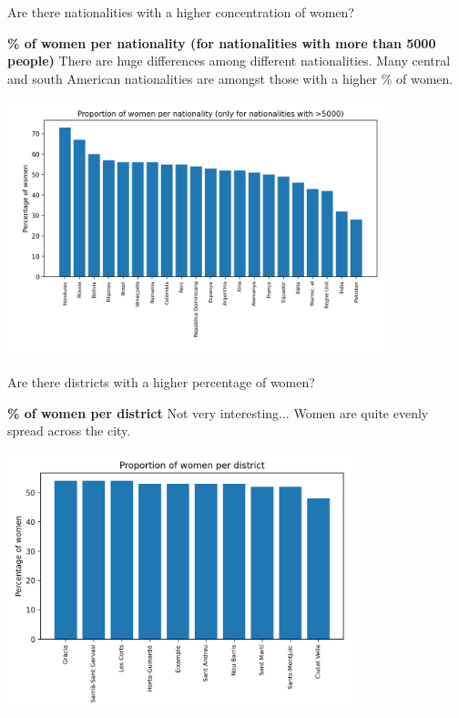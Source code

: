 \documentclass[8pt]{beamer}
\begin{document}
\begin{frame}{Are there nationalities with a higher concentration of women?}

\begin{block}{\textbf{\% of women per nationality (for nationalities with more than 5000 people)}} 
There are huge differences among different nationalities. Many central and south American nationalities are amongst those with a higher \% of women.
\end{block}

\includegraphics[width=11cm, trim= 2cm 0cm 0cm 0cm]{proportion_gender_per_nationality.png}


\end{frame}

\begin{frame}{Are there districts with a higher percentage of women?}

\begin{block}{\textbf{\% of women per district}} 
Not very interesting... Women are quite evenly spread across the city.
\end{block}

\includegraphics[width=10cm, trim= 0.5cm 0cm 0cm 0cm]{proportion_women_districts.png}
\end{frame}
\end{document}
